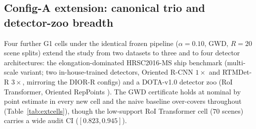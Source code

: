 \documentclass[journal]{IEEEtran}
\begin{document}
\subsection{Config-A extension: canonical trio and detector-zoo breadth}\label{sec:configA}
Four further G1 cells under the identical frozen pipeline ($\alpha=0.10$, GWD, $R{=}20$ scene splits) extend
the study from two datasets to three and to four detector architectures: the elongation-dominated HRSC2016-MS ship
benchmark \citep{liu2017hrsc2016} (multi-scale variant; two in-house-trained detectors, Oriented R-CNN $1\times$ and RTMDet-R
$3\times$, mirroring the DIOR-R configs) and a DOTA-v1.0 detector zoo (RoI Transformer, Oriented RepPoints \citep{li2022reppoints}).
The GWD certificate holds at nominal by point estimate in every new cell and the naive baseline over-covers
throughout (Table~\ref{tab:extcells}), though the low-support RoI Transformer cell ($70$ scenes) carries a
wide audit CI ($[0.823,0.945]$).
\end{document}

